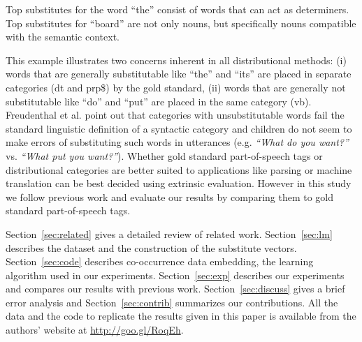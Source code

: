 Top substitutes for the word ``the'' consist of words that can act as
determiners.  Top substitutes for ``board'' are not only nouns, but
specifically nouns compatible with the semantic context.

This example illustrates two concerns inherent in all distributional
methods: (i) words that are generally substitutable like ``the'' and
``its'' are placed in separate categories ({\sc dt} and {\sc prp\$})
by the gold standard, (ii) words that are generally not substitutable
like ``do'' and ``put'' are placed in the same category ({\sc vb}).
Freudenthal et al.  point out
that categories with unsubstitutable words fail the standard
linguistic definition of a syntactic category and children do not seem
to make errors of substituting such words in utterances
(e.g. {\em``What do you want?''}  vs. {\em *``What put you want?''}).
Whether gold standard part-of-speech tags or distributional categories
are better suited to applications like parsing or machine translation
can be best decided using extrinsic evaluation.  However in this study
we follow previous work and evaluate our results by comparing them to
gold standard part-of-speech tags.

Section~\ref{sec:related} gives a detailed review of related work.
Section~\ref{sec:lm} describes the dataset and the construction of the
substitute vectors.  Section~\ref{sec:code} describes co-occurrence
data embedding, the learning algorithm used in our experiments.
Section~\ref{sec:exp} describes our experiments and compares our
results with previous work.  Section~\ref{sec:discuss} gives a brief
error analysis and Section~\ref{sec:contrib} summarizes our
contributions.  All the data and the code to replicate the results
given in this paper is available from the authors' website at
\mbox{\url{http://goo.gl/RoqEh}}.




